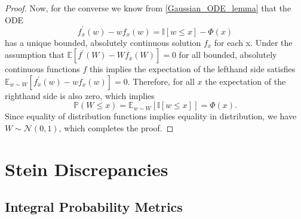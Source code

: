 \documentclass[12pt]{article}
\newcommand{\indicator}[1]{\mathbb{I}[#1]}
\newcommand{\E}{\mathbb{E}}
\newcommand{\Prob}{\mathbb{P}}
\newcommand{\Gaussian}{\mathcal{N}}
\newcommand{\GaussianCDF}{\Phi}
\begin{document}
\begin{proof}
Now, for the converse we know from \ref{Gaussian_ODE_lemma} that the ODE 
\[
f_x^\prime(w) - wf_x(w) = \indicator{w \leq x} - \GaussianCDF(x)
\]
has a unique bounded, absolutely continuous solution $f_x$ for each x. Under the assumption that $\E\left[f^\prime(W) - Wf_x(W)\right] = 0$ for all bounded, absolutely 
continuous functions $f$ this implies the expectation of the lefthand side satisfies $\E_{w \sim W} \left[f_x^\prime(w) - wf_x(w)\right] = 0$. Therefore, for all $x$ the expectation 
of the righthand side is also zero, which implies 
\[\Prob(W \leq x) = \E_{w \sim W}\left[\indicator{w \leq x}\right] = \GaussianCDF(x).\]
Since equality of distribution functions implies equality in distribution, we have $W \sim \Gaussian(0,1)$, which completes the proof. 
\end{proof} 


\section{Stein Discrepancies}
\subsection{Integral Probability Metrics}
\end{document}
